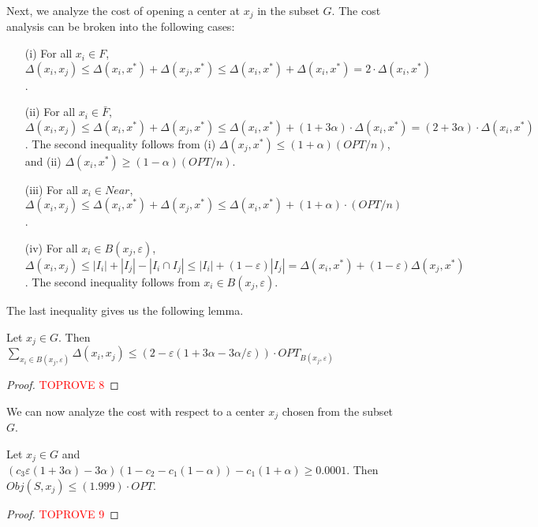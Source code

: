 \documentclass[11pt]{llncs}
\newcommand{\veps}{\varepsilon}
\begin{document}
Next, we analyze the cost of opening a center at $x_j$ in the subset $G$. The cost analysis can be broken into the following cases:
\begin{enumerate}
\item[(i)] For all $x_i \in F$, $\Delta(x_i, x_j) \leq \Delta(x_i, x^*) + \Delta(x_j, x^*) \leq \Delta(x_i, x^*) + \Delta(x_i, x^*) = 2 \cdot \Delta(x_i, x^*)$.
\item[(ii)] For all $x_i \in \bar{F}$, $\Delta(x_i, x_j) \leq \Delta(x_i, x^*) + \Delta(x_j, x^*) \leq \Delta(x_i, x^*) + (1+3\alpha) \cdot \Delta(x_i, x^*) = (2+3\alpha) \cdot \Delta(x_i, x^*)$. The second inequality follows from (i) $\Delta(x_j, x^*) \leq (1+\alpha) (OPT/n)$, and (ii) $\Delta(x_i, x^*) \geq (1-\alpha)(OPT/n)$.
\item[(iii)] For all $x_i \in Near$, $\Delta(x_i, x_j) \leq \Delta(x_i, x^*) + \Delta(x_j, x^*) \leq \Delta(x_i, x^*) + (1+\alpha)\cdot (OPT/n)$.
\item[(iv)] For all $x_i \in B(x_j, \veps)$,  $\Delta(x_i, x_j) \leq |I_i| + |I_j| - |I_i \cap I_j| \leq |I_i| + (1-\veps) |I_j| = \Delta(x_i, x^*) + (1-\veps) \Delta(x_j, x^*)$. The second inequality follows from $x_i \in B(x_j, \veps)$.
\end{enumerate}



The last inequality gives us the following lemma.



\begin{lemma}\label{lemma:4}
Let $x_j \in G$. Then $\sum_{x_i \in B(x_j, \veps)} \Delta(x_i, x_j) \leq \left(2 - \veps (1+3\alpha-3\alpha/\veps)\right) \cdot OPT_{B(x_j, \veps)}$
\end{lemma}
\begin{proof}\textcolor{red}{TOPROVE 8}\end{proof}
We can now analyze the cost with respect to a center $x_j$ chosen from the subset $G$.

\begin{lemma}\label{lemma:5}
Let $x_j \in G$ and  $\left( c_3 \veps (1+3\alpha) - 3\alpha\right) (1 - c_2 - c_1(1-\alpha)) - c_1(1+\alpha) \geq 0.0001$.
Then $Obj(S, x_j) \leq (1.999) \cdot OPT$.
\end{lemma}
\begin{proof}\textcolor{red}{TOPROVE 9}\end{proof}
\end{document}
